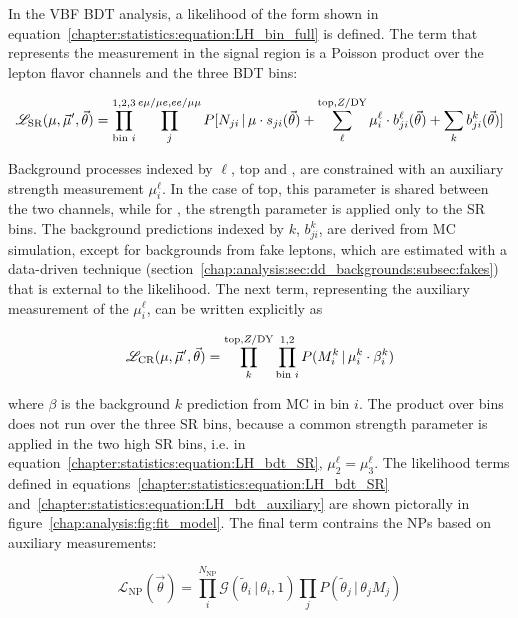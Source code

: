 In the VBF BDT analysis, a likelihood of the form shown in
equation~\ref{chapter:statistics:equation:LH_bin_full} is defined. The
term that represents the measurement in the signal region is a Poisson
product over the lepton flavor channels and the three BDT bins:

\begin{equation}
\mathscr{L}_{\textrm{SR}}(\mu,\vec{\mu}^{\prime},\vec{\theta}) =
\prod_{\textrm{bin }i}^{1,2,3} \prod_{j}^{e\mu/\mu e,ee/\mu\mu}
P[N_{ji} \,|\,
\mu\cdot s_{ji}(\vec{\theta}) + \sum_{\ell}^{\textrm{top},Z/\mathrm{DY}}
\mu^{\ell}_{i}\cdot b^{\ell}_{ji}(\vec{\theta}) + \sum_{k}
b^{k}_{ji}(\vec{\theta})]
\label{chapter:statistics:equation:LH_bdt_SR}
\end{equation}

\noindent
Background processes indexed by $\ell$, top and \ZDY, are constrained with an auxiliary
strength measurement $\mu^{\ell}_{i}$. In the case of top, this
parameter is shared between the two channels, while for \ZDY, the
strength parameter is applied only to the \eemm SR bins. The background predictions indexed by $k$,
$b^{k}_{ji}$, are derived from MC simulation, except for backgrounds
from fake leptons, which are estimated with a data-driven technique
(section~\ref{chap:analysis:sec:dd_backgrounds:subsec:fakes}) that is
external to the likelihood. The next term,
representing the auxiliary measurement of the $\mu^{\ell}_{i}$, can be
written explicitly as 

\begin{equation}
\mathscr{L}_{\textrm{CR}}(\mu,\vec{\mu}^{\prime},\vec{\theta}) =
\prod_{k}^{\textrm{top},Z/\mathrm{DY}} \prod_{\textrm{bin }i}^{1,2}
P(M_{i}^{k} \,|\, \mu_{i}^{k}\cdot \beta^{k}_i)
\label{chapter:statistics:equation:LH_bdt_auxiliary}
\end{equation}

\noindent
where $\beta$ is the background $k$ prediction from MC in bin $i$. The
product over bins does not run over the three SR bins, because a
common strength parameter is applied in the two high SR bins, i.e. in
equation~\ref{chapter:statistics:equation:LH_bdt_SR}, $\mu^{\ell}_{2}
= \mu^{\ell}_{3}$. The likelihood terms defined in equations~\ref{chapter:statistics:equation:LH_bdt_SR}
and~\ref{chapter:statistics:equation:LH_bdt_auxiliary} are shown
pictorally in figure~\ref{chap:analysis:fig:fit_model}. The final term
contrains the NPs based on auxiliary measurements:

\begin{equation}
\mathscr{L}_{\textrm{NP}}(\vec{\theta}) = \prod_i^{N_{\textrm{NP}}}
\mathscr{G}(\tilde{\theta}_i \,|\,
\theta_i,1) \prod_j P(\tilde{\theta}_j \,|\, \theta_j M_j)
\label{chapter:statistics:equation:LH_bdt_NP}
\end{equation}

